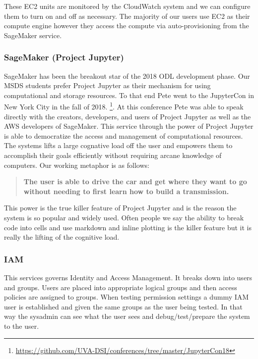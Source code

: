 These EC2 units are monitored by the CloudWatch system and we can configure them to turn on and off as necessary. The majority of our users use EC2 as their compute engine however they access the compute via auto-provisioning from the SageMaker service.


\subsubsection{SageMaker (Project Jupyter)}
\label{sec:projectjupyter}

SageMaker has been the breakout star of the 2018 ODL development phase. Our MSDS students prefer Project Jupyter as their mechanism for using computational and storage resources. To that end Pete went to the JupyterCon in New York City in the fall of 2018. \footnote{\url{https://github.com/UVA-DSI/conferences/tree/master/JupyterCon18}}.
At this conference Pete was able to speak directly with the creators, developers, and users of Project Jupyter as well as the AWS developers of SageMaker. This service through the power of Project Jupyter is able to democratize the access and management of computational resources. The systems lifts a large cognative load off the user and empowers them to accomplish their goals efficiently without requiring arcane knowledge of computers. Our working metaphor is as follows:

\begin{quote}
\textbf{
The user is able to drive the car and get where they want to go without needing to first learn how to build a transmission.
}
\end{quote}

This power is the true killer feature of Project Jupyter and is the reason the system is so popular and widely used. Often people we say the ability to break code into cells and use markdown and inline plotting is the killer feature but it is really the lifting of the cognitive load.

\subsubsection{IAM}
This services governs Identity and Access Management. It breaks down into users and groups. Users are placed into appropriate logical groups and then access policies are assigned to groups.
When testing permission settings a dummy IAM user is established and given the same groups as the user being tested. In that way the sysadmin can see what the user sees and debug/test/prepare the system to the user.
